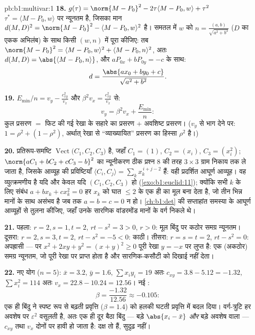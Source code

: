 \begin{solution}{pb:b1:multivar:1}
\textbf{18.} $g(\tau) = \norm{M - P_0}^2 - 2\tau\langle M - P_0, w\rangle
+ \tau^2$ $\tau^* = \langle M - P_0, w\rangle$ पर न्यूनतम है, जिसका मान
$d(M,D)^2 = \norm{M - P_0}^2 - \langle M - P_0, w\rangle^2$ है। समतल में
$w$ को $n = \frac{(a, b)}{\sqrt{a^2+b^2}}$ ($D$ का एकक अभिलंब) के साथ किसी
  $(w, n)$ में पूरा कीजिए: तब $\norm{M - P_0}^2 =
\langle M - P_0, w\rangle^2 + \langle M - P_0, n\rangle^2$, अतः $d(M, D) =
\abs{\langle M - P_0, n\rangle}$, और $aP_{0x} + bP_{0y} = -c$ के साथ:
\[
d = \frac{\abs{a x_0 + b y_0 + c}}{\sqrt{a^2 + b^2}} .
\]

\textbf{19.} $E_{\min}/n = v_y - \frac{c_{xy}^2}{v_x}$ और $\beta^2 v_x =
\frac{c_{xy}^2}{v_x}$ से:
\[
v_y = \beta^2 v_x + \frac{E_{\min}}n :
\]
कुल प्रसरण $=$ फिट की गई रेखा के सहारे का प्रसरण $+$ अवशिष्ट प्रसरण।
($v_y$ से भाग देने पर: $1 = \rho^2 + (1 - \rho^2)$, अर्थात् रेखा से
``व्याख्यायित'' प्रसरण का हिस्सा $\rho^2$ है।)

\textbf{20.} प्रतिरूप-समष्टि $\operatorname{Vect}\bigl(C_1, C_2,
C_3\bigr)$ है, जहाँ $C_1 = (1)$, $C_2 = (x_i)$, $C_3 = (x_i^2)$;
$\norm{aC_1 + bC_2 + cC_3 - b}^2$ का न्यूनीकरण ठीक प्रश्न 8 की तरह
$3\times3$ ग्राम निकाय तक ले जाता है, जिसके आव्यूह की प्रविष्टियाँ $\langle
C_i, C_j\rangle = \sum_k x_k^{\,i+j-2}$ हैं: वही प्रदर्शित आघूर्ण आव्यूह।
वह व्युत्क्रमणीय है यदि और केवल यदि $(C_1, C_2, C_3)$  हो
(\cref{exo:b1:euclid:11}); क्योंकि सभी $k$ के लिए संबंध $a + bx_k + cx_k^2
= 0$ हर $x_k$ को घात $\leq 2$ के एक ही  का मूल बना देता है, जो तीन
भिन्न मानों के साथ असंभव है जब तक $a = b = c = 0$ न हो। \cref{ch:b1:det}
की सप्ताहांत समस्या के आघूर्ण आव्यूहों से तुलना कीजिए, जहाँ उनके सारणिक
वांडरमोंड मानों के वर्ग निकले थे।

\textbf{21.} पहला: $r = 2, s = 1, t = 2$, $rt - s^2 = 3 > 0$, $r > 0$:
मूल बिंदु पर कठोर समग्र न्यूनतम। दूसरा: $r = 2, s = 3, t = 2$, $rt - s^2
= -5 < 0$: काठी। तीसरा: $r = s = t = 2$, $rt - s^2 = 0$: अपह्रासी --- पर
$x^2 + 2xy + y^2 = (x + y)^2 \geq 0$ पूरी रेखा $y = -x$ पर लुप्त है: एक
(अकठोर) समग्र न्यूनतम, जो पूरी रेखा पर प्राप्त होता है और सारणिक-कसौटी को
दिखाई नहीं देता।

\textbf{22.} नए योग ($n = 5$): $\bar x = 3.2$, $\bar y = 1.6$, $\sum
x_iy_i = 19$ अतः $c_{xy} = 3.8 - 5.12 = -1.32$, $\sum x_i^2 = 114$ अतः
$v_x = 22.8 - 10.24 = 12.56$। नई :
\[
\beta = \frac{-1.32}{12.56} \approx -0.105 :
\]
एक ही बिंदु ने स्पष्ट रूप से बढ़ती प्रवृत्ति ($\beta = 1.4$) को हलकी घटती
प्रवृत्ति में बदल दिया। वर्ग-त्रुटि हर अवशेष पर $\varepsilon^2$ वसूलती है,
अतः एक ही दूर बैठा बिंदु --- बड़े $\abs{x_{i} - \bar x}$ \emph{और} बड़े
अवशेष वाला --- $c_{xy}$ तथा $v_x$ दोनों पर हावी हो जाता है: 
दक्ष तो हैं, सुदृढ़ नहीं।


\end{solution}
